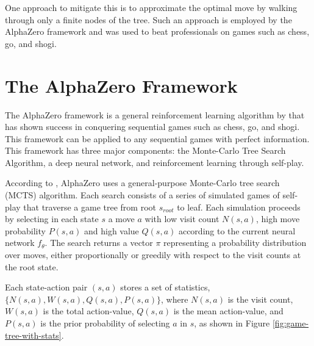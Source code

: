 One approach to mitigate this is to approximate the optimal move by walking through only a finite nodes of the tree. Such an approach is employed by the AlphaZero framework and was used to beat professionals on games such as chess, go, and shogi.

\section{The AlphaZero Framework}

The AlphaZero framework is a general reinforcement learning algorithm by \cite{silver2017masteringchessshogiselfplay} that has shown success in conquering sequential games such as chess, go, and shogi. This framework can be applied to any sequential games with perfect information. This framework has three major components: the Monte-Carlo Tree Search Algorithm, a deep neural network, and reinforcement learning through self-play.

According to \cite{silver2017masteringchessshogiselfplay}, AlphaZero uses a general-purpose Monte-Carlo tree search (MCTS) algorithm. Each search consists of a series of simulated games of self-play that traverse a game tree from root $s_{root}$ to leaf. Each simulation proceeds by selecting in each state $s$ a move $a$ with low visit count $N(s, a)$, high move probability $P(s,a)$ and high value $Q(s, a)$ according to the current neural network $f_\theta$. The search returns a vector $\pi$ representing a probability distribution over moves, either proportionally or greedily with respect to the visit counts at the root state.

Each state-action pair $(s,a)$ stores a set of statistics, $\{N(s, a), W(s, a), Q(s, a), P(s, a)\}$, where $N(s, a)$ is the visit count, $W(s, a)$ is the total action-value, $Q(s, a)$ is the mean action-value, and $P(s, a)$ is the prior probability of selecting $a$ in $s$, as shown in Figure \ref{fig:game-tree-with-stats}.

